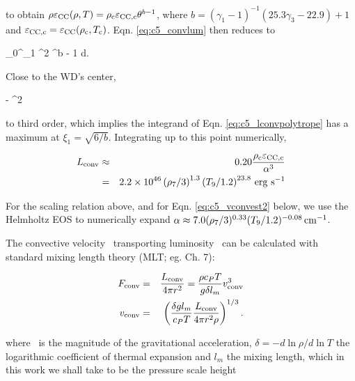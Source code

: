 \noindent to obtain $\rho\epscc(\rho, T) = \rhoc\epscentral\theta^{b - 1}$, where $b = (\gamma_1 - 1)^{-1}(25.3\gamma_3 - 22.9) + 1$ and $\epscentral = \epscc(\rhoc, \Tc)$.  Eqn. \ref{eq:c5_convlum} then reduces to

\eqbegin
\Lconv {}\pi\rhoc\epscentral{}\int_0^{\xi_1} \xi^2 \theta^{b - 1} d\xi.
\label{eq:c5_lconvpolytrope}
\eqend

\noindent Close to the WD's center, 

\eqbegin
\theta {} - \xi^2
\label{eq:c5_theta_approx}
\eqend

\noindent to third order, which implies the integrand of Eqn. \ref{eq:c5_lconvpolytrope} has a maximum at $\xi_1 = \sqrt{6/b}$.  Integrating {\charles up to this point} numerically,

\begin{eqnarray}
\Lconv &\approx& 0.20\frac{\rhoc\epscentral}{\alpha^3}  \nonumber \\
&=& 2.2\times10^{46}\left(\rho_7/3\right)^{1.3}\left(T_9/1.2\right)^{23.8}\,\mrm{erg}\,\,\mrm{s}^{-1}
\label{eq:c5_convlumred}
\end{eqnarray}

\noindent For the scaling relation above, and for Eqn. \ref{eq:c5_vconvest2} below, we use the Helmholtz EOS to numerically expand $\alpha \approx 7.0(\rho_7/3)^{0.33}(T_9/1.2)^{-0.08}\,\mathrm{cm}^{-1}$.


The convective velocity \vconv\ transporting luminosity \Lconv\ can be calculated with standard mixing length theory (MLT; eg. \citealt{kippww12} Ch. 7):

\begin{eqnarray}
\Fconv &=& \frac{\Lconv}{4\pi r^2} = \frac{\rho c_PT}{\gacc\delta l_m} \vconv^3 \nonumber \\
\vconv &=& \left(\frac{\delta \gacc l_m}{c_P T}\frac{\Lconv}{4\pi r^2 \rho}\right)^{1/3}.
\label{eq:c5_vconv_mlt}
\end{eqnarray}


\noindent where \gacc\ is the magnitude of the gravitational acceleration, $\delta = -d\ln\rho/d\ln T$ the logarithmic coefficient of thermal expansion and $l_m$ the mixing length, which in this work we shall take to be the pressure scale height

